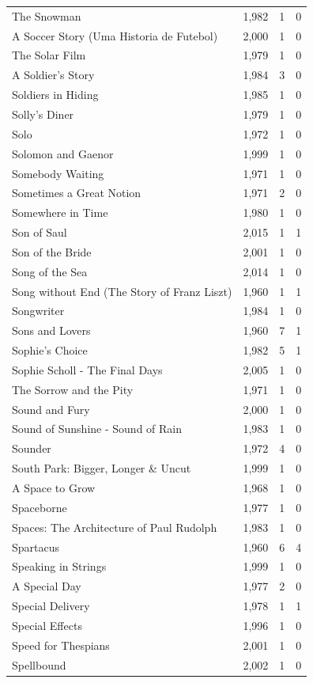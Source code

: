 \begin{tabular}{lrrr}
The Snowman & 1,982 & 1 & 0 \\
A Soccer Story (Uma Historia de Futebol) & 2,000 & 1 & 0 \\
The Solar Film & 1,979 & 1 & 0 \\
A Soldier's Story & 1,984 & 3 & 0 \\
Soldiers in Hiding & 1,985 & 1 & 0 \\
Solly's Diner & 1,979 & 1 & 0 \\
Solo & 1,972 & 1 & 0 \\
Solomon and Gaenor & 1,999 & 1 & 0 \\
Somebody Waiting & 1,971 & 1 & 0 \\
Sometimes a Great Notion & 1,971 & 2 & 0 \\
Somewhere in Time & 1,980 & 1 & 0 \\
Son of Saul & 2,015 & 1 & 1 \\
Son of the Bride & 2,001 & 1 & 0 \\
Song of the Sea & 2,014 & 1 & 0 \\
Song without End (The Story of Franz Liszt) & 1,960 & 1 & 1 \\
Songwriter & 1,984 & 1 & 0 \\
Sons and Lovers & 1,960 & 7 & 1 \\
Sophie's Choice & 1,982 & 5 & 1 \\
Sophie Scholl - The Final Days & 2,005 & 1 & 0 \\
The Sorrow and the Pity & 1,971 & 1 & 0 \\
Sound and Fury & 2,000 & 1 & 0 \\
Sound of Sunshine - Sound of Rain & 1,983 & 1 & 0 \\
Sounder & 1,972 & 4 & 0 \\
South Park: Bigger, Longer \& Uncut & 1,999 & 1 & 0 \\
A Space to Grow & 1,968 & 1 & 0 \\
Spaceborne & 1,977 & 1 & 0 \\
Spaces: The Architecture of Paul Rudolph & 1,983 & 1 & 0 \\
Spartacus & 1,960 & 6 & 4 \\
Speaking in Strings & 1,999 & 1 & 0 \\
A Special Day & 1,977 & 2 & 0 \\
Special Delivery & 1,978 & 1 & 1 \\
Special Effects & 1,996 & 1 & 0 \\
Speed for Thespians & 2,001 & 1 & 0 \\
Spellbound & 2,002 & 1 & 0 \\

\end{tabular}
